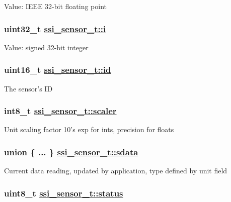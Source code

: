 Value: IEEE 32-bit floating point \hypertarget{structssi__sensor__t_a775f2114a8d9f1dea8a0cf9e1ce37b1}{
\subsubsection[i]{\setlength{\rightskip}{0pt plus 5cm}uint32\_\-t \hyperlink{structssi__sensor__t_a775f2114a8d9f1dea8a0cf9e1ce37b1}{ssi\_\-sensor\_\-t::i}}}
\label{structssi__sensor__t_a775f2114a8d9f1dea8a0cf9e1ce37b1}


Value: signed 32-bit integer \hypertarget{structssi__sensor__t_8b3e3e3f864d8e04c9b666a08ba20261}{
\subsubsection[id]{\setlength{\rightskip}{0pt plus 5cm}uint16\_\-t \hyperlink{structssi__sensor__t_8b3e3e3f864d8e04c9b666a08ba20261}{ssi\_\-sensor\_\-t::id}}}
\label{structssi__sensor__t_8b3e3e3f864d8e04c9b666a08ba20261}


The sensor's ID \hypertarget{structssi__sensor__t_6bbdc857baffd97f4832a621c5b15343}{
\subsubsection[scaler]{\setlength{\rightskip}{0pt plus 5cm}int8\_\-t \hyperlink{structssi__sensor__t_6bbdc857baffd97f4832a621c5b15343}{ssi\_\-sensor\_\-t::scaler}}}
\label{structssi__sensor__t_6bbdc857baffd97f4832a621c5b15343}


Unit scaling factor 10's exp for ints, precision for floats \hypertarget{structssi__sensor__t_e3694c3eec6093c8a81844bd00206dd8}{
\subsubsection[sdata]{\setlength{\rightskip}{0pt plus 5cm}union \{ ... \}   \hyperlink{structssi__sensor__t_e3694c3eec6093c8a81844bd00206dd8}{ssi\_\-sensor\_\-t::sdata}}}
\label{structssi__sensor__t_e3694c3eec6093c8a81844bd00206dd8}


Current data reading, updated by application, type defined by unit field \hypertarget{structssi__sensor__t_3bd3afd85de5f062280f40b14a565328}{
\subsubsection[status]{\setlength{\rightskip}{0pt plus 5cm}uint8\_\-t \hyperlink{structssi__sensor__t_3bd3afd85de5f062280f40b14a565328}{ssi\_\-sensor\_\-t::status}}}
\label{structssi__sensor__t_3bd3afd85de5f062280f40b14a565328}


